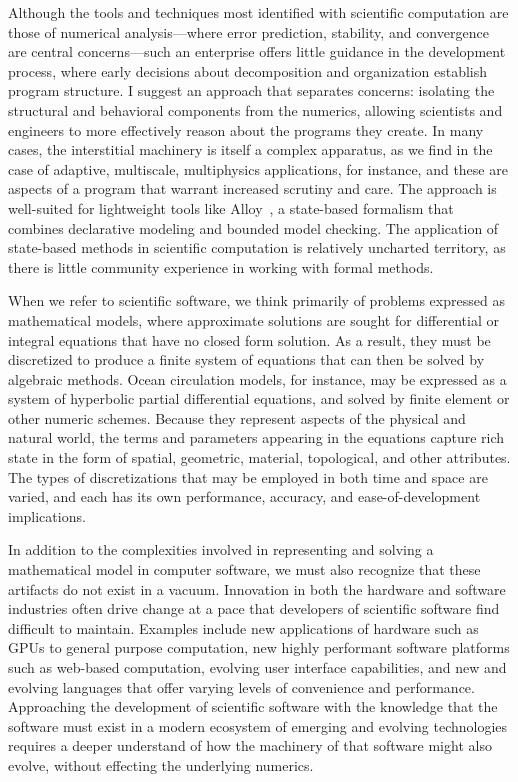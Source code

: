 \documentclass[../../proposal.tex]{subfiles}
\begin{document}
Although the tools and techniques most identified with scientific
computation are those of numerical analysis---where error prediction,
stability, and convergence are central concerns---such an enterprise
offers little guidance in the development process, where early
decisions about decomposition and organization establish program
structure.  I suggest an approach that separates concerns: isolating
the structural and behavioral components from the numerics, allowing
scientists and engineers to more effectively reason about the programs
they create.  In many cases, the interstitial machinery is itself a
complex apparatus, as we find in the case of adaptive, multiscale,
multiphysics applications, for instance, and these are aspects of a
program that warrant increased scrutiny and care.  The approach is
well-suited for lightweight tools like Alloy~\cite{jackson2012}, a
state-based formalism that combines declarative modeling and bounded
model checking.  The application of state-based methods in scientific
computation is relatively uncharted territory, as there is little
community experience in working with formal methods.  

When we refer to scientific
software, we think primarily of problems expressed as mathematical
models, where approximate solutions are sought for differential or
integral equations that have no closed form solution.  As a result,
they must be discretized to produce a finite system of equations that can then be solved by algebraic methods.  Ocean circulation models, for
instance, may be expressed as a system of hyperbolic partial
differential equations, and solved by finite element or other numeric
schemes.  Because they represent aspects of the physical and natural
world, the terms and parameters appearing in the equations capture rich
state in the form of spatial, geometric, material, topological, and
other attributes.  The types of discretizations that may be employed in
both time and space are varied, and each has its own performance,
accuracy, and ease-of-development implications.

In addition to the complexities involved in representing and solving a
mathematical model in computer software, we must also recognize that
these artifacts do not exist in a vacuum.  Innovation in both the
hardware and software industries often drive change at a pace that
developers of scientific software find difficult to maintain.  Examples
include new applications of hardware such as GPUs to general purpose
computation, new highly performant software platforms such as web-based
computation, evolving user interface capabilities, and new and evolving
languages that offer varying levels of convenience and performance. 
Approaching the development of scientific software with the knowledge
that the software must exist in a modern ecosystem of emerging and
evolving technologies requires a deeper understand of how the machinery
of that software might also evolve, without effecting the underlying
numerics.  
\end{document}
